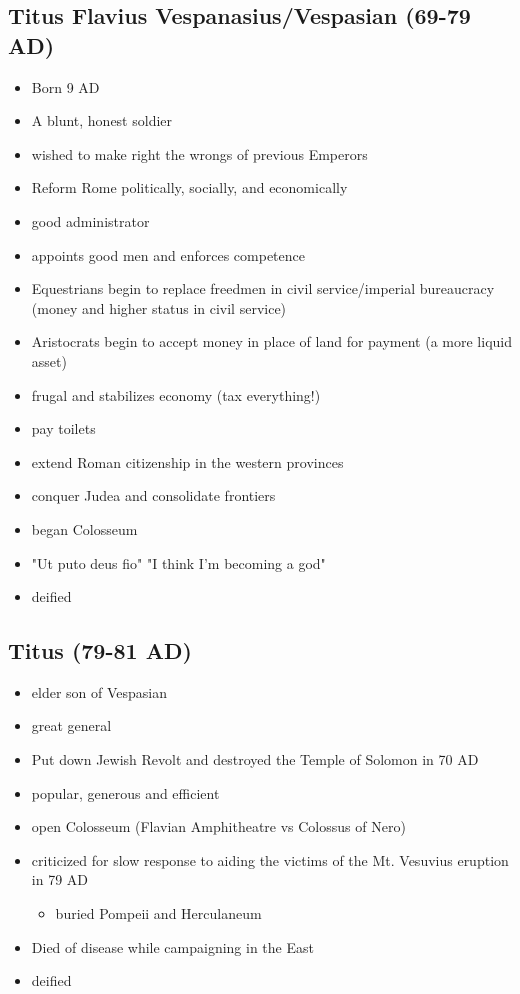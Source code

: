 \documentclass[12pt, twoside]{article}
\begin{document}
\subsection{Titus Flavius Vespanasius/Vespasian (69-79 AD)}
\begin{itemize}
\item Born 9 AD
\item A blunt, honest soldier
\item wished to make right the wrongs of previous Emperors
\item Reform Rome politically, socially, and economically
\item good administrator
\item appoints good men and enforces competence
\item Equestrians begin to replace freedmen in civil service/imperial bureaucracy (money and higher status in civil service)
\item Aristocrats begin to accept money in place of land for payment (a more liquid asset)
\item frugal and stabilizes economy (tax everything!)
\item pay toilets
\item extend Roman citizenship in the western provinces
\item conquer Judea and consolidate frontiers
\item began Colosseum
\item "Ut puto deus fio" "I think I'm becoming a god"
\item deified
\end{itemize}

\subsection{Titus (79-81 AD)}
\begin{itemize}
\item elder son of Vespasian
\item great general
\item Put down Jewish Revolt and destroyed the Temple of Solomon in 70 AD
\item popular, generous and efficient
\item open Colosseum (Flavian Amphitheatre vs Colossus of Nero)
\item criticized for slow response to aiding the victims of the Mt. Vesuvius eruption in 79 AD
	\begin{itemize}
	\item buried Pompeii and Herculaneum
	\end{itemize}
\item Died of disease while campaigning in the East
\item deified
\end{itemize}
\end{document}
